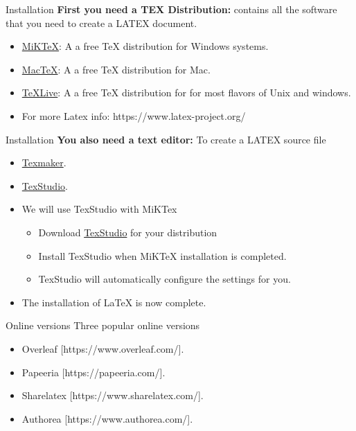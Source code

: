 \documentclass{beamer}
\begin{document}
\begin{darkframes}
   
   
   \begin{frame}[<+->]{Installation}
   	\textbf{First you need a TEX Distribution:} contains all the software that you need to create a LATEX document.
   	\begin{itemize}
   		\item \href{http://miktex.org/}{MiKTeX}: A a free TeX distribution for Windows systems.
   		\item \href{http://www.tug.org/mactex/}{MacTeX}: A a free TeX distribution for Mac.
   		\item \href{https://www.tug.org/texlive/}{TeXLive}: A a free TeX distribution for for most flavors of Unix and windows.
   		\item  For more Latex info: https://www.latex-project.org/
   	\end{itemize}
   	
   \end{frame}
   
   
   \begin{frame}[<+->]{Installation}
   	\textbf{You also need a text editor:} To create a LATEX source file
   	\begin{itemize}
   		\item \href{http://www.xm1math.net/texmaker/}{Texmaker}.
   		\item \href{http://www.texstudio.org/}{TexStudio}.
   		\item We will use TexStudio with MiKTex
   		\begin{itemize}
   			\item Download \href{http://www.texstudio.org/}{TexStudio} for your distribution
   			\item Install TexStudio when MiKTeX installation is completed.
   			\item TexStudio will automatically configure the settings for you.
   		\end{itemize}
   		\item The installation of LaTeX is now complete.
   	\end{itemize}
   \end{frame}
   
   \begin{frame}[<+->]{Online versions}
   	Three popular online versions
   	\begin{itemize}
   		\item Overleaf [https://www.overleaf.com/].
   		\item Papeeria [https://papeeria.com/].
   		\item Sharelatex [https://www.sharelatex.com/].
   		\item Authorea [https://www.authorea.com/].
   	\end{itemize}
   \end{frame}


\end{darkframes}
\end{document}
